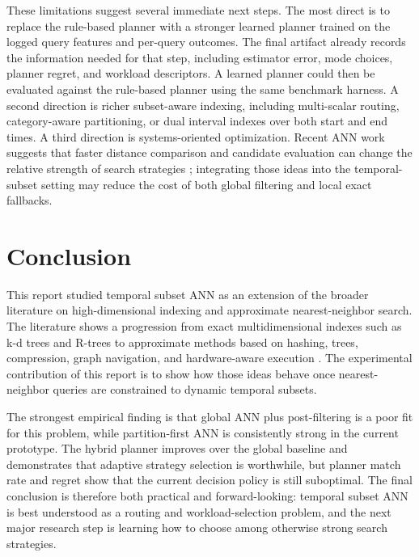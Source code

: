 \documentclass[sigconf,nonacm]{acmart}
\begin{document}
These limitations suggest several immediate next steps. The most direct is to replace the rule-based planner with a stronger learned planner trained on the logged query features and per-query outcomes. The final artifact already records the information needed for that step, including estimator error, mode choices, planner regret, and workload descriptors. A learned planner could then be evaluated against the rule-based planner using the same benchmark harness. A second direction is richer subset-aware indexing, including multi-scalar routing, category-aware partitioning, or dual interval indexes over both start and end times. A third direction is systems-oriented optimization. Recent ANN work suggests that faster distance comparison and candidate evaluation can change the relative strength of search strategies \cite{gao2023}; integrating those ideas into the temporal-subset setting may reduce the cost of both global filtering and local exact fallbacks.

\section{Conclusion}

This report studied temporal subset ANN as an extension of the broader literature on high-dimensional indexing and approximate nearest-neighbor search. The literature shows a progression from exact multidimensional indexes such as k-d trees and R-trees to approximate methods based on hashing, trees, compression, graph navigation, and hardware-aware execution \cite{bentley1975,guttman1984,indyk1998,gionis1999,muja2014,jegou2011,fu2019,malkov2020,johnson2021}. The experimental contribution of this report is to show how those ideas behave once nearest-neighbor queries are constrained to dynamic temporal subsets.

The strongest empirical finding is that global ANN plus post-filtering is a poor fit for this problem, while partition-first ANN is consistently strong in the current prototype. The hybrid planner improves over the global baseline and demonstrates that adaptive strategy selection is worthwhile, but planner match rate and regret show that the current decision policy is still suboptimal. The final conclusion is therefore both practical and forward-looking: temporal subset ANN is best understood as a routing and workload-selection problem, and the next major research step is learning how to choose among otherwise strong search strategies.



\end{document}

